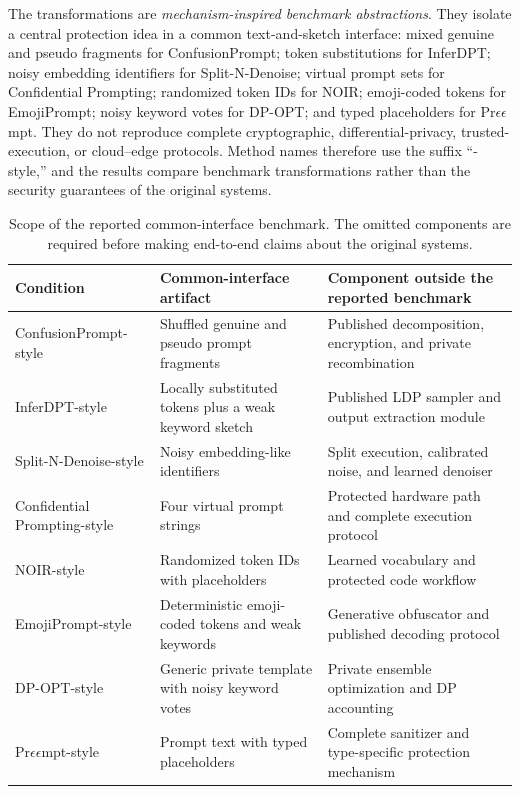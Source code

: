 \documentclass[letterpaper]{article} %
\begin{document}
The transformations are \emph{mechanism-inspired benchmark abstractions}.  They isolate a central protection idea in a common text-and-sketch interface: mixed genuine and pseudo fragments for ConfusionPrompt; token substitutions for InferDPT; noisy embedding identifiers for Split-N-Denoise; virtual prompt sets for Confidential Prompting; randomized token IDs for NOIR; emoji-coded tokens for EmojiPrompt; noisy keyword votes for DP-OPT; and typed placeholders for Pr$\epsilon\epsilon$mpt.  They do not reproduce complete cryptographic, differential-privacy, trusted-execution, or cloud--edge protocols.  Method names therefore use the suffix ``-style,'' and the results compare benchmark transformations rather than the security guarantees of the original systems.

\begin{table}[t]
\centering
\small
\setlength{\tabcolsep}{4pt}
\begin{tabular}{p{}p{}p{}}
\toprule
Condition & Common-interface artifact & Component outside the reported benchmark \\
\midrule
ConfusionPrompt-style & Shuffled genuine and pseudo prompt fragments & Published decomposition, encryption, and private recombination \\
InferDPT-style & Locally substituted tokens plus a weak keyword sketch & Published LDP sampler and output extraction module \\
Split-N-Denoise-style & Noisy embedding-like identifiers & Split execution, calibrated noise, and learned denoiser \\
Confidential Prompting-style & Four virtual prompt strings & Protected hardware path and complete execution protocol \\
NOIR-style & Randomized token IDs with placeholders & Learned vocabulary and protected code workflow \\
EmojiPrompt-style & Deterministic emoji-coded tokens and weak keywords & Generative obfuscator and published decoding protocol \\
DP-OPT-style & Generic private template with noisy keyword votes & Private ensemble optimization and DP accounting \\
Pr$\epsilon\epsilon$mpt-style & Prompt text with typed placeholders & Complete sanitizer and type-specific protection mechanism \\
\bottomrule
\end{tabular}
\caption{Scope of the reported common-interface benchmark.  The omitted components are required before making end-to-end claims about the original systems.}
\label{tab:benchmark_scope}
\end{table}
\end{document}
